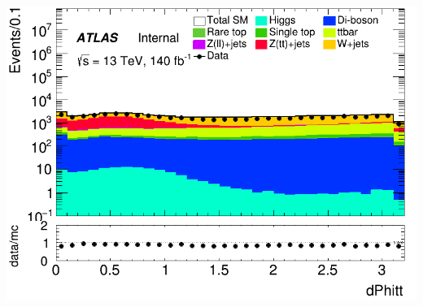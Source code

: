 \documentclass[usenames,dvipsnames]{beamer}
\begin{document}
\begin{frame}
\begin{minipage}{0.32\textwidth}
        \includegraphics[width=\textwidth]{graphics/LH_met/LH_met_dPhitt.png}
    \end{minipage}
\end{frame}
\end{document}
